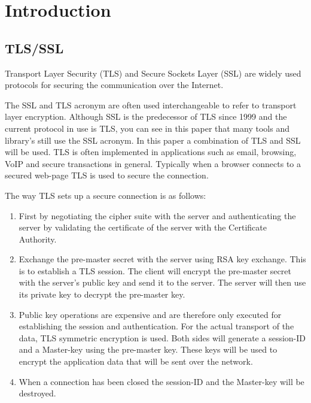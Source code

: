 \documentclass[12pt, a4paper]{report}
\begin{document}
\tableofcontents


\chapter{Introduction}

\section{TLS/SSL}

Transport Layer Security (TLS) and Secure Sockets Layer (SSL) are widely used protocols for securing the communication over the Internet. 

The SSL and TLS acronym are often used interchangeable to refer to transport layer encryption. Although SSL is the predecessor of TLS since 1999 and the current protocol in use is TLS, you can see in this paper that many tools and library's still use the SSL acronym. In this paper a combination of TLS and SSL will be used.
\newline
\newline
TLS is often implemented in applications such as email, browsing, VoIP and secure transactions in general. Typically when a browser connects to a secured web-page TLS is used to secure the connection. 

\noindent The way TLS sets up a secure connection is as follows: 

\begin{enumerate}
\item First by negotiating the cipher suite with the server and  authenticating the server by validating the certificate of the server with the Certificate Authority. 
\item Exchange the pre-master secret with the server using RSA key exchange. This is to establish a TLS session. 
The client will encrypt the pre-master secret with the server's public key and send it to the server. The server will then use its private key to decrypt the pre-master key.
\item Public key operations are expensive and are therefore only executed for establishing the session and authentication. For the actual transport of the data, TLS symmetric encryption is used. Both sides will generate a session-ID and a Master-key using the pre-master key. These keys will be used to encrypt the application data that will be sent over the network.
\item When a connection has been closed the session-ID and the Master-key will be destroyed.  
\end{enumerate}
\end{document}
